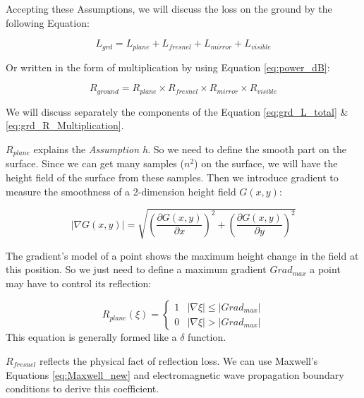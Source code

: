 \documentclass{mcmthesis}
\begin{document}
    Accepting these Assumptions, we will discuss the loss on the ground by the following Equation:

    \begin{equation}\label{eq:grd_L_total}
      L_{grd} = L_{plane} + L_{fresnel} + L_{mirror} + L_{visible}
    \end{equation}

    Or written in the form of multiplication by using Equation \ref{eq:power_dB}:

    \begin{equation}\label{eq:grd_R_Multiplication}
      R_{ground} = R_{plane} \times R_{fresnel} \times R_{mirror} \times R_{visible}
    \end{equation}

    We will discuss separately the components of the Equation \ref{eq:grd_L_total} \& \ref{eq:grd_R_Multiplication}.

    $R_{plane}$ explains the \emph{Assumption h}. So we need to define the smooth part on the surface. Since we can get many samples ($n^2$) on the surface, we will have the height field of the surface from these samples. Then we introduce gradient to measure the smoothness of a 2-dimension height field $G(x,y)$:

      \begin{equation}\label{eq:gradient}
        |\nabla G(x,y)| = \sqrt{(\frac{\partial G(x,y)}{\partial x})^2 + (\frac{\partial G(x,y)}{\partial y})^2}
      \end{equation}

    The gradient's model of a point shows the maximum height change in the field at this position. So we just need to define a maximum gradient $Grad_{max}$ a point may have to control its reflection:

      \begin{equation}\label{eq:R_plane}
        R_{plane}(\xi) =
        \begin{cases}
          1&\text{$|\nabla \xi| \leq |Grad_{max}|$}\\
          0&\text{$|\nabla \xi| > |Grad_{max}|$}
        \end{cases}
      \end{equation}
      This equation is generally formed like a $\delta$ function.

    $R_{fresnel}$ reflects the physical fact of reflection loss. We can use Maxwell's Equations \ref{eq:Maxwell_new} and electromagnetic wave propagation boundary conditions to derive this coefficient\cite{Hainan}.
\end{document}
